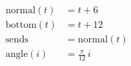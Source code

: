 \documentclass[12pt]{article}
\begin{document}
\[
\begin{aligned}
  \mathrm{normal}(t) &= t+6 \\[2pt]
  \mathrm{bottom}(t) &= t+12 \\[2pt]
  \mathrm{sends}     &= \mathrm{normal}(t) \\[2pt]
  \mathrm{angle}(i)  &= \tfrac{\pi}{12}\, i
\end{aligned}
\]
\end{document}
